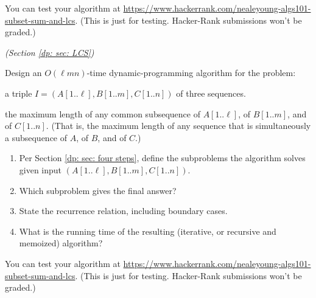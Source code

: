 \documentclass[11pt]{article}
\begin{document}
You can test your algorithm at \url{https://www.hackerrank.com/nealeyoung-algs101-subset-sum-and-lcs}.
(This is just for testing. Hacker-Rank submissions won't be graded.)

\vfill

\setlength{\ITEMHT}{2in}
{\injectEnumerate
}





\newpage

\problem\emph{(Section \ref{dp: sec: LCS})}

Design an $O(\ell m n)$-time dynamic-programming algorithm for the  problem:
\begin{mylist}
\item[\bf input:] a triple $I=(A[1..\ell],B[1..m],C[1..n])$ of three sequences.
\item[\bf output:] the maximum length of any common subsequence of $A[1..\ell]$, of $B[1..m]$, and of $C[1..n]$.
  \smallskip 
  (That is, the maximum length of any sequence that is simultaneously a subsequence of $A$, of $B$, and of $C$.)
\end{mylist}

\begin{enumerate}[label=(\alph*)]
\item Per Section \ref{dp: sec: four steps}, define the subproblems the algorithm solves given input $(A[1..\ell], B[1..m], C[1..n])$.
\item Which subproblem gives the final answer? 
\item State the recurrence relation, including boundary cases.
\item What is the running time of the resulting (iterative, or recursive and memoized) algorithm?
\end{enumerate}

You can test your algorithm at \url{https://www.hackerrank.com/nealeyoung-algs101-subset-sum-and-lcs}.
(This is just for testing. Hacker-Rank submissions won't be graded.)

\vfill
\setlength{\ITEMHT}{2in}
{\injectEnumerate
}
\end{document}
